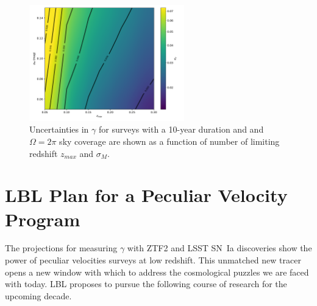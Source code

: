 \documentclass[11pt, oneside]{article}   	%
\begin{document}
\begin{figure}
\centering
\includegraphics[width=0.6\textwidth]{src/surface2.pdf}
\caption{Uncertainties in $\gamma$ for surveys with a 10-year duration and  and $\Omega=2\pi$ sky coverage 
are shown as a function of number of limiting  redshift $z_{max}$ and $\sigma_M$.
\label{lsst:fig}}
\end{figure}


\section{LBL Plan for a Peculiar Velocity Program}
The projections for measuring $\gamma$ with ZTF2 and LSST SN~Ia discoveries
show the power of peculiar velocities surveys at low redshift.
This unmatched new tracer opens a new window with which to address
the cosmological puzzles we are faced with today.
LBL proposes to pursue the following course of research for the upcoming decade.
\end{document}
